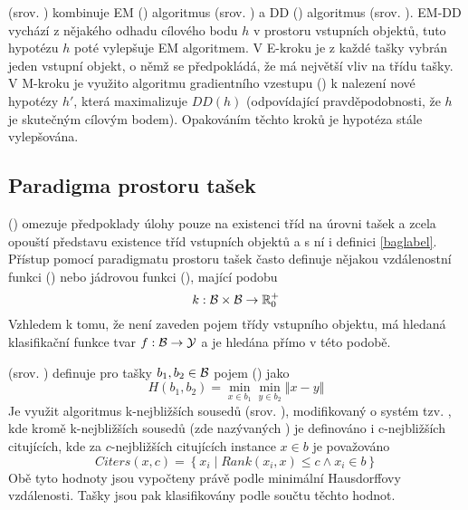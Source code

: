  (srov. \cite{zhang_em-dd:_2002}) kombinuje EM () algoritmus (srov. \cite{dempster_maximum_1977}) a DD () algoritmus (srov. \cite{maron_framework_1998}). EM-DD vychází z nějakého odhadu cílového bodu \( h \) v prostoru vstupních objektů, tuto hypotézu \( h \) poté vylepšuje EM algoritmem. V E-kroku je z každé tašky vybrán jeden vstupní objekt, o němž se předpokládá, že má největší vliv na třídu tašky. V M-kroku je využito algoritmu gradientního vzestupu () k nalezení nové hypotézy \( h' \), která maximalizuje \( DD \left( h \right) \) (odpovídající pravděpodobnosti, že \( h \) je skutečným cílovým bodem). Opakováním těchto kroků je hypotéza stále vylepšována.


\subsection{Paradigma prostoru tašek}
 () omezuje předpoklady úlohy  pouze na existenci tříd na úrovni tašek a zcela opouští představu existence tříd vstupních objektů a s ní i definici \ref{baglabel}. Přístup pomocí paradigmatu prostoru tašek často definuje nějakou vzdálenostní funkci () nebo jádrovou funkci (), mající podobu
\[ k : \mathcal B \times \mathcal B \to \mathbb R_0^+ \]
Vzhledem k tomu, že není zaveden pojem třídy vstupního objektu, má hledaná klasifikační funkce tvar \( f : \mathcal B \to \mathcal Y \) a je hledána přímo v této podobě.

 (srov. \cite{wang_solving_2000}) definuje pro tašky \( b_1, b_2 \in \mathcal B \) pojem  () jako
\[ H \left( b_1, b_2 \right) = \min_{x \in b_1} \min_{y \in b_2} \left\Vert x - y \right\Vert \]
Je využit algoritmus k-nejbližších sousedů (srov. \cite{dasarathy_nearest_1991}), modifikovaný o systém tzv. , kde kromě k-nejbližších sousedů (zde nazývaných ) je definováno i c-nejbližších citujících, kde za \( c \)-nejbližších citujících instance \( x \in b \) je považováno
\[ Citers \left( x, c \right) = \left\{ x_i \middle| Rank \left( x_i, x \right) \leq c \land x_i \in b \right\} \]
Obě tyto hodnoty jsou vypočteny právě podle minimální Hausdorffovy vzdálenosti. Tašky jsou pak klasifikovány podle součtu těchto hodnot.

